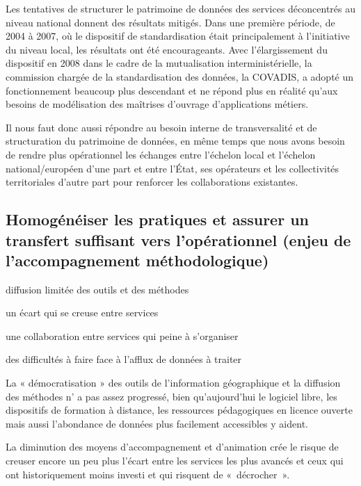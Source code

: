 Les tentatives de structurer le patrimoine de données des services
déconcentrés au niveau national donnent des résultats mitigés. Dans une
première période, de 2004 à 2007, où le dispositif de standardisation était
principalement à l'initiative du niveau local, les résultats ont été
encourageants. Avec l'élargissement du dispositif en 2008 dans le cadre de la
mutualisation interministérielle, la commission chargée de la standardisation
des données, la COVADIS, a adopté un fonctionnement beaucoup plus descendant
et ne répond plus en réalité qu'aux besoins de modélisation des maîtrises
d'ouvrage d'applications métiers.

Il nous faut donc aussi répondre au besoin interne de transversalité et de
structuration du patrimoine de données, en même temps que nous avons besoin de
rendre plus opérationnel les échanges entre l'échelon local et l'échelon
national/européen d'une part et entre l'État, ses opérateurs et les
collectivités territoriales d'autre part pour renforcer les collaborations
existantes.

\subsection[constats:homogeneisation]
{Homogénéiser les pratiques et assurer un transfert suffisant vers
l'opérationnel (enjeu de l'accompagnement méthodologique)}

\subject{Constats}

{\it

\startitemize[a,packed]

\item diffusion limitée des outils et des méthodes

\item un écart qui se creuse entre services

\item une collaboration entre services qui peine à s'organiser

\item des difficultés à faire face à l'afflux de données à traiter

\stopitemize}

La « démocratisation » des outils de
l'information géographique et la diffusion des méthodes n' a pas assez progressé,
bien qu'aujourd'hui le logiciel libre, les dispositifs de formation à distance, les ressources
pédagogiques en licence ouverte mais aussi l'abondance de données plus
facilement accessibles y aident.

La diminution des moyens d'accompagnement et d'animation crée le risque de
creuser encore un peu plus l'écart entre les services les plus avancés et ceux
qui ont historiquement moins investi et qui risquent de « décrocher ».

